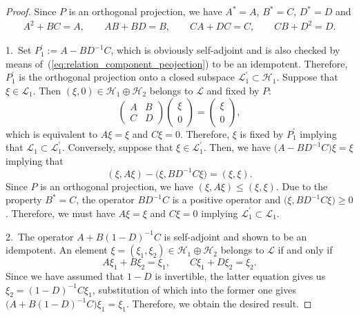 \documentclass[11pt]{article}
\numberwithin{equation}{section}
\numberwithin{equation}{section}
\newcommand{\pr}[1]{#1^{\prime}}
\newcommand{\mcal}[1]{\mathcal{#1}}
\begin{document}
\begin{proof}
Since $P$ is an orthogonal projection, we have $A^{\ast}=A$, $B^{\ast}=C$, $D^{\ast}=D$ and
\begin{gather}\label{eq:relation_component_peojection}
	A^{2}+BC =A, \qquad AB+BD =B, \qquad CA+DC = C, \qquad CB+D^{2} =D.
\end{gather}

1.~Set $\pr{P}_{1}:=A-BD^{-1}C$, which is obviously self-adjoint and is also checked by means of~(\ref{eq:relation_component_peojection}) to be an idempotent.
		Therefore, $\pr{P}_{1}$ is the orthogonal projection onto a closed subspace $\pr{\mcal{L}}_{1}\subset\mcal{H}_{1}$.
		Suppose that $\xi\in\mcal{L}_{1}$. Then $(\xi,0)\in\mcal{H}_{1}\oplus \mcal{H}_{2}$ belongs to $\mcal{L}$ and fixed by $P$:
		\begin{equation*}
		\left(
		\begin{matrix}
		A & B \\
		C & D
		\end{matrix}
		\right)\left(
		\begin{matrix}
		\xi \\
		0
		\end{matrix}
		\right)=\left(
		\begin{matrix}
		\xi \\
		0
		\end{matrix}
		\right),
		\end{equation*}
		which is equivalent to $A\xi=\xi$ and $C\xi=0$.
		Therefore, $\xi$ is fixed by $\pr{P}_{1}$ implying that $\mcal{L}_{1}\subset \pr{\mcal{L}}_{1}$.
		Conversely, suppose that $\xi\in \pr{\mcal{L}}_{1}$. Then, we have $\big(A-BD^{-1}C\big)\xi=\xi$ implying that
		\begin{equation*}
			(\xi,A\xi)-\big(\xi,BD^{-1}C\xi\big)=(\xi,\xi).
		\end{equation*}
		Since $P$ is an orthogonal projection, we have $(\xi,A\xi)\le (\xi,\xi)$. Due to the property $B^{\ast}=C$, the operator $BD^{-1}C$ is a positive operator and $\big(\xi,BD^{-1}C\xi\big)\ge 0$. Therefore, we must have $A\xi=\xi$ and $C\xi=0$ implying $\pr{\mcal{L}}_{1}\subset \mcal{L}_{1}$.

2.~The operator $A+B(1-D)^{-1}C$ is self-adjoint and shown to be an idempotent.
		An element $\xi=(\xi_{1},\xi_{2})\in\mcal{H}_{1}\oplus\mcal{H}_{2}$ belongs to $\mcal{L}$ if and only if
		\begin{equation*}
			A\xi_{1}+B\xi_{2}=\xi_{1},\qquad C\xi_{1}+D\xi_{2}=\xi_{2}.
		\end{equation*}
		Since we have assumed that $1-D$ is invertible, the latter equation gives us $\xi_{2}=(1-D)^{-1}C\xi_{1}$, substitution of which into the former one gives $\big(A+B(1-D)^{-1}C\big)\xi_{1}=\xi_{1}$. Therefore, we obtain the desired result.
\end{proof}
\end{document}
